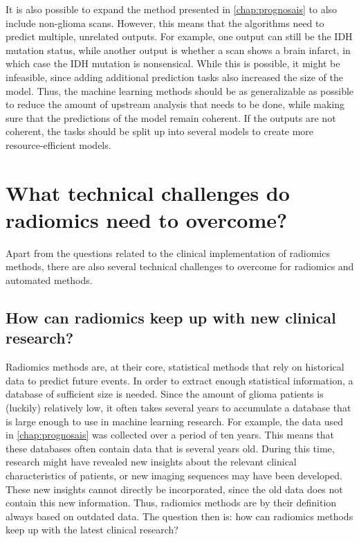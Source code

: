It is also possible to expand the method presented in \cref{chap:prognosais} to also include non-glioma scans.
However, this means that the algorithms need to predict multiple, unrelated outputs.
For example, one output can still be the \gls{IDH} mutation status, while another output is whether a scan shows a brain infarct, in which case the \gls{IDH} mutation is nonsensical.
While this is possible, it might be infeasible, since adding additional prediction tasks also increased the size of the model.
Thus, the machine learning methods should be as generalizable as possible to reduce the amount of upstream analysis that needs to be done, while making sure that the predictions of the model remain coherent.
If the outputs are not coherent, the tasks should be split up into several models to create more resource-efficient models.



\section{What technical challenges do radiomics need to overcome?}\label{sec:discussion_technical}
Apart from the questions related to the clinical implementation of radiomics methods, there are also several technical challenges to overcome for radiomics and automated methods.

\subsection{How can radiomics keep up with new clinical research?}
Radiomics methods are, at their core, statistical methods that rely on historical data to predict future events.
In order to extract enough statistical information, a database of sufficient size is needed.
Since the amount of glioma patients is (luckily) relatively low, it often takes several years to accumulate a database that is large enough to use in machine learning research.
For example, the data used in \cref{chap:prognosais} was collected over a period of ten years.
This means that these databases often contain data that is several years old.
During this time, research might have revealed new insights about the relevant clinical characteristics of patients, or new imaging sequences may have been developed.
These new insights cannot directly be incorporated, since the old data does not contain this new information.
Thus, radiomics methods are by their definition always based on outdated data.
The question then is: how can radiomics methods keep up with the latest clinical research?

